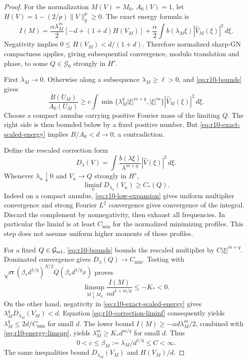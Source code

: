 \begin{proof}
For the normalization $M(V)=M_0$, $A_0(V)=1$, let
$H(V)=1-(2/p)\|V\|_p^p\ge0$. The exact energy formula is
\begin{equation}\label{eq:r10-exact-scaled-energy}
 I(M)=\frac{\alpha\lambda_M^m}{2}
          [-d+(1+d)H(V_M)]
       +\frac\alpha2\int b(\lambda_M\xi)|\widehat V_M(\xi)|^2\,d\xi.
\end{equation}
Negativity implies $0\le H(V_M)<d/(1+d)$. Therefore normalized
sharp-GN compactness applies, giving subsequential convergence, modulo
translation and phase, to some $Q\in\mathcal G_0$ strongly in $H^s$.

First $\lambda_M\to0$. Otherwise along a subsequence
$\lambda_M\ge\ell>0$, and \eqref{eq:r10-bounds} gives
\[
 \frac{B(U_M)}{A_0(U_M)}
 \ge c\int\min\{\lambda_M^q|\xi|^{m+q},|\xi|^m\}
                         |\widehat V_M(\xi)|^2\,d\xi.
\]
Choose a compact annulus carrying positive Fourier mass of the limiting
$Q$. The right side is then bounded below by a fixed positive number.
But \eqref{eq:r10-exact-scaled-energy} implies $B/A_0<d\to0$, a
contradiction.

Define the rescaled correction form
\[
 D_\lambda(V)=\int\frac{b(\lambda\xi)}{\lambda^{m+q}}
                              |\widehat V(\xi)|^2\,d\xi.
\]
Whenever $\lambda_n\downarrow0$ and $V_n\to Q$ strongly in $H^s$,
\begin{equation}\label{eq:r10-correction-liminf}
 \liminf_n D_{\lambda_n}(V_n)\ge C_*(Q).
\end{equation}
Indeed on a compact annulus, \eqref{eq:r10-low-expansion} gives uniform
multiplier convergence and strong Fourier $L^2$ convergence gives
convergence of the integral. Discard the complement by nonnegativity,
then exhaust all frequencies. In particular the liminf is at least
$C_{\min}$ for the normalized minimizing profiles. This step does not
assume uniform higher moments of those profiles.

For a fixed $Q\in\mathcal G_{\rm sel}$,
\eqref{eq:r10-bounds} bounds the rescaled multiplier by
$C|\xi|^{m+q}$. Dominated convergence gives
$D_\lambda(Q)\to C_{\min}$. Testing with
$\sqrt\alpha(\beta_*d^{1/q})^{N/2}Q(\beta_*d^{1/q}x)$ proves
\begin{equation}\label{eq:r10-energy-limsup}
 \limsup_{M\downarrow M_0}\frac{I(M)}{\alpha d^{1+m/q}}
 \le-K_*<0.
\end{equation}
On the other hand, negativity in
\eqref{eq:r10-exact-scaled-energy} gives
$\lambda_M^qD_{\lambda_M}(V_M)<d$. Equation
\eqref{eq:r10-correction-liminf} consequently yields
$\lambda_M^q\le2d/C_{\min}$ for small $d$. The lower bound
$I(M)\ge-\alpha d\lambda_M^m/2$, combined with
\eqref{eq:r10-energy-limsup}, yields
$\lambda_M^m\ge K_*d^{m/q}$ for small $d$. Thus
\begin{equation}\label{eq:r10-scale-comparable}
 0<c\le\beta_M:=\lambda_M/d^{1/q}\le C<\infty.
\end{equation}
The same inequalities bound $D_{\lambda_M}(V_M)$ and $H(V_M)/d$.


\end{proof}
